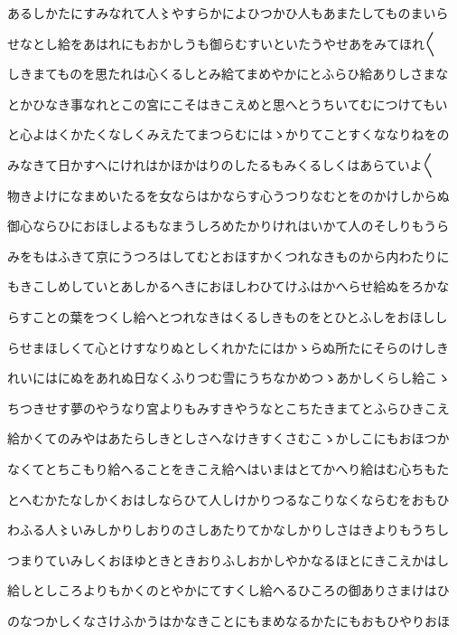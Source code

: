 \documentclass[a4paper,11pt,landscape]{ltjtarticle}
\begin{document}
\par\medskip
あるしかたにすみなれて人〻やすらかによひつかひ人もあまたしてものまいら
\par\medskip
せなとし給をあはれにもおかしうも御らむすいといたうやせあをみてほれ〱
\par\medskip
しきまてものを思たれは心くるしとみ給てまめやかにとふらひ給ありしさまな
\par\medskip
とかひなき事なれとこの宮にこそはきこえめと思へとうちいてむにつけてもい
\par\medskip
と心よはくかたくなしくみえたてまつらむにはゝかりてことすくななりねをの
\par\medskip
みなきて日かすへにけれはかほかはりのしたるもみくるしくはあらていよ〱
\par\medskip
物きよけになまめいたるを女ならはかならす心うつりなむとをのかけしからぬ
\par\medskip
御心ならひにおほしよるもなまうしろめたかりけれはいかて人のそしりもうら
\par\medskip
みをもはふきて京にうつろはしてむとおほすかくつれなきものから内わたりに
\par\medskip
もきこしめしていとあしかるへきにおほしわひてけふはかへらせ給ぬをろかな
\par\medskip
らすことの葉をつくし給へとつれなきはくるしきものをとひとふしをおほしし
\par\medskip
らせまほしくて心とけすなりぬとしくれかたにはかゝらぬ所たにそらのけしき
\par\medskip
れいにはにぬをあれぬ日なくふりつむ雪にうちなかめつゝあかしくらし給こゝ
\par\medskip
ちつきせす夢のやうなり宮よりもみすきやうなとこちたきまてとふらひきこえ
\par\medskip
給かくてのみやはあたらしきとしさへなけきすくさむこゝかしこにもおほつか
\par\medskip
なくてとちこもり給へることをきこえ給へはいまはとてかへり給はむ心ちもた
\par\medskip
とへむかたなしかくおはしならひて人しけかりつるなこりなくならむをおもひ
\par\medskip
わふる人〻いみしかりしおりのさしあたりてかなしかりしさはきよりもうちし
\par\medskip
つまりていみしくおほゆときときおりふしおかしやかなるほとにきこえかはし
\par\medskip
給しとしころよりもかくのとやかにてすくし給へるひころの御ありさまけはひ
\par\medskip
のなつかしくなさけふかうはかなきことにもまめなるかたにもおもひやりおほ
\end{document}
